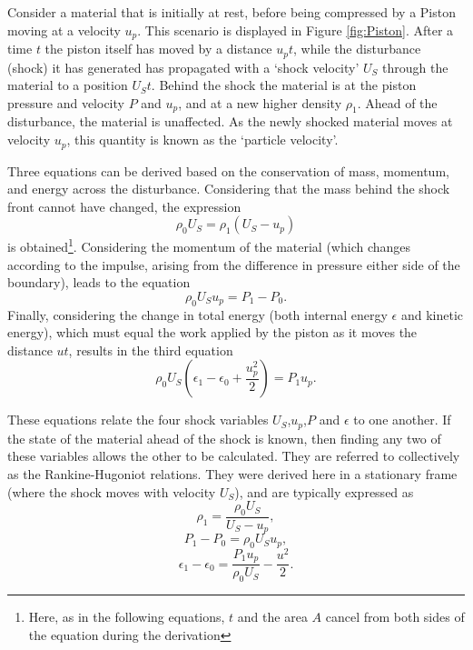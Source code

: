 Consider a material that is initially at rest, before being compressed by a Piston moving at a velocity $u_p$. This scenario is displayed in Figure \ref{fig:Piston}. After a time $t$ the piston itself has moved by a distance $u_pt$, while the disturbance (shock) it has generated has propagated with a `shock velocity' $U_S$ through the material to a position $U_S t$. Behind the shock the material is at the piston pressure and velocity $P$ and $u_p$, and at a new higher density $\rho_1$. Ahead of the disturbance, the material is unaffected. As the newly shocked material moves at velocity $u_p$, this quantity is known as the `particle velocity'.

Three equations can be derived based on the conservation of mass, momentum, and energy across the disturbance. Considering that the mass behind the shock front cannot have changed, the expression
\begin{equation} \rho_0 U_S = \rho_1 (U_S - u_p) \end{equation}
is obtained\footnote{Here, as in the following equations, $t$ and the area $A$ cancel from both sides of the equation during the derivation}. Considering the momentum of the material (which changes according to the impulse, arising from the difference in pressure either side of the boundary), leads to the equation 
\begin{equation} \rho_0 U_S u_p = P_1 - P_0. \end{equation}
Finally, considering the change in total energy (both internal energy $\epsilon$ and kinetic energy), which must equal the work applied by the piston as it moves the distance $ut$, results in the third equation 
\begin{equation} \rho_0 U_S (\epsilon_1 - \epsilon_0 + \frac{u_p^2}{2}) = P_1 u_p. \end{equation}

These equations relate the four shock variables $U_S$,$u_p$,$P$ and $\epsilon$ to one another. If the state of the material ahead of the shock is known, then finding any two of these variables allows the other to be calculated. They are referred to collectively as the Rankine-Hugoniot relations. They were derived here in a stationary frame (where the shock moves with velocity $U_S$), and are typically expressed as
\begin{equation} \rho_1 = \frac{\rho_0 U_S}{U_S - u_p}, \label{eqn: RH1 stationary} \end{equation}
\begin{equation} P_1 - P_0 = \rho_0 U_S u_p, \label{eqn: RH2 stationary} \end{equation}
\begin{equation} \epsilon_1 - \epsilon_0 = \frac{P_1 u_p}{\rho_0 U_S} - \frac{u^2}{2}. \label{eqn: RH3 stationary} \end{equation}

